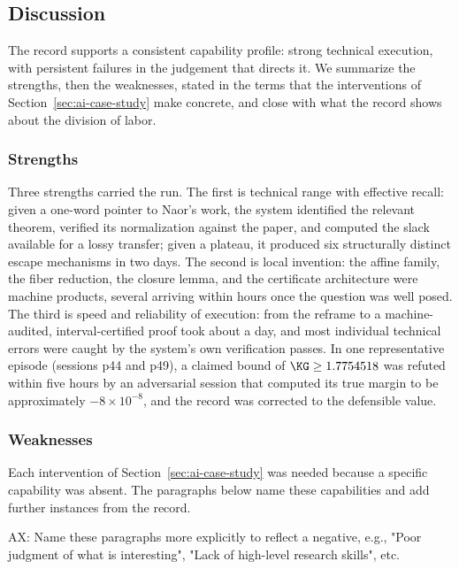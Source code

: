 \subsection{Discussion}
\label{sec:ai-discussion}

The record supports a consistent capability profile: strong technical
execution, with persistent failures in the judgement that directs it. We
summarize the strengths, then the weaknesses, stated in the terms that the
interventions of Section~\ref{sec:ai-case-study} make concrete, and close
with what the record shows about the division of labor.

\subsubsection{Strengths}

Three strengths carried the run. The first is technical range with effective
recall: given a one-word pointer to Naor's work, the system identified the
relevant theorem, verified its normalization against the paper, and computed
the slack available for a lossy transfer; given a plateau, it produced six
structurally distinct escape mechanisms in two days. The second is local
invention: the affine family, the fiber reduction, the closure lemma, and
the certificate architecture were machine products, several arriving within
hours once the question was well posed. The third is speed and reliability
of execution: from the reframe to a machine-audited, interval-certified
proof took about a day, and most individual technical errors were caught by
the system's own verification passes. In one representative episode
(sessions p44 and p49), a claimed bound of $\KG\ge1.7754518$
was refuted within five hours by an adversarial session that computed its
true margin to be approximately $-8\times10^{-8}$, and the record was
corrected to the defensible value.

\subsubsection{Weaknesses}

Each intervention of Section~\ref{sec:ai-case-study} was needed because a
specific capability was absent. The paragraphs below name these
capabilities and add further instances from the record.

{\color{red}
AX: Name these paragraphs more explicitly to reflect a negative,
e.g., "Poor judgment of what is interesting", "Lack of high-level research skills", etc.}

